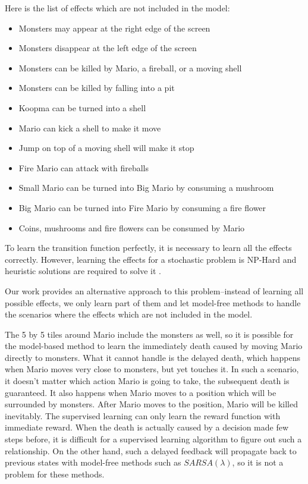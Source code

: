 Here is the list of effects which are not included in the model:
\begin{itemize}
\item Monsters may appear at the right edge of the screen
\item Monsters disappear at the left edge of the screen
\item Monsters can be killed by Mario, a fireball, or a moving shell
\item Monsters can be killed by falling into a pit
\item Koopma can be turned into a shell
\item Mario can kick a shell to make it move
\item Jump on top of a moving shell will make it stop
\item Fire Mario can attack with fireballs
\item Small Mario can be turned into Big Mario by consuming a mushroom
\item Big Mario can be turned into Fire Mario by consuming a fire flower
\item Coins, mushrooms and fire flowers can be consumed by Mario
\end{itemize}

To learn the transition function perfectly, it is necessary to 
learn all the effects correctly. However, learning the effects for a stochastic
problem is NP-Hard \cite{Walsh09} and heuristic solutions are required
to solve it \cite{Pasula07}.

Our work provides an alternative approach to this problem--instead of learning 
all possible effects, we only learn part of them and 
let model-free methods to handle the scenarios where
the effects which are not included in the model.

The 5 by 5 tiles around Mario include the monsters as well,
so it is possible for the model-based method to learn the immediately
death caused by moving Mario directly to monsters. What it cannot handle is the delayed death, which happens when
Mario moves very close to monsters, but yet touches it.
In such a scenario, it doesn't matter which action Mario is going to take, 
the subsequent death is guaranteed. 
It also happens when Mario moves to a position which will be surrounded by
monsters. After Mario moves to the position, Mario will be killed inevitably.
The supervised learning can only learn the reward function with immediate reward.
When the death is actually caused by a decision made few steps before, it is difficult
for a supervised learning algorithm to figure out such a relationship. 
On the other hand, such a delayed feedback will propagate back to previous states with model-free methods
such as $SARSA(\lambda)$, so it is not a problem for these methods.

